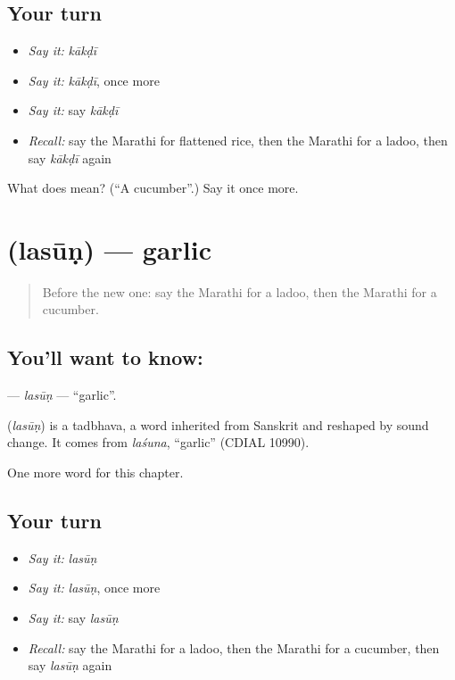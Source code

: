 \subsection*{Your turn}
\begin{itemize}
\raggedright
  \item \emph{Say it:} \emph{kākḍī}
  \item \emph{Say it:} \emph{kākḍī}, once more
  \item \emph{Say it:} say \emph{kākḍī}
  \item \emph{Recall:} say the Marathi for flattened rice, then the Marathi for a ladoo, then say \emph{kākḍī} again
\end{itemize}

\begin{tcolorbox}[breakable,colback=teal!4,colframe=teal!35!black,title={Before you move on}]
What does  mean? (\textquotedblleft{}A cucumber\textquotedblright{}.) Say it once more.
\end{tcolorbox}
\section[\texorpdfstring{\mr{लसूण} (lasūṇ)}{लसूण (lasūṇ)}]{ (lasūṇ) — garlic}

\label{lesson:MR-C137-lasun}



\begin{quote}
Before the new one: say the Marathi for a ladoo, then the Marathi for a cucumber.
\end{quote}

\subsection*{You'll want to know: }
\textbf{} — \emph{lasūṇ} — \textquotedblleft{}garlic\textquotedblright{}.

\begin{cousinweb}
\textbf{} (\emph{lasūṇ}) is a tadbhava, a word inherited from Sanskrit and reshaped by sound change. It comes from \emph{laśuna}, \textquotedblleft{}garlic\textquotedblright{} (CDIAL 10990).
\end{cousinweb}

\begin{grammarlens}[title={What you've built}]
One more word for this chapter.
\end{grammarlens}

\subsection*{Your turn}
\begin{itemize}
\raggedright
  \item \emph{Say it:} \emph{lasūṇ}
  \item \emph{Say it:} \emph{lasūṇ}, once more
  \item \emph{Say it:} say \emph{lasūṇ}
  \item \emph{Recall:} say the Marathi for a ladoo, then the Marathi for a cucumber, then say \emph{lasūṇ} again
\end{itemize}

